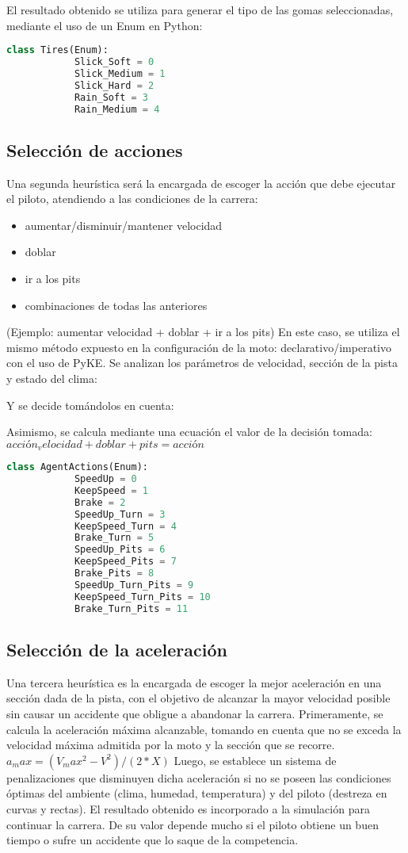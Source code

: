 	El resultado obtenido se utiliza para generar el tipo de las gomas seleccionadas, mediante el uso de un Enum en Python:
	\begin{lstlisting}[language={Python}, label={Script}]
		class Tires(Enum):
		    Slick_Soft = 0
		    Slick_Medium = 1
		    Slick_Hard = 2
		    Rain_Soft = 3
		    Rain_Medium = 4
	\end{lstlisting}


\subsection{Selección de acciones}
	Una segunda heurística será la encargada de escoger la acción que debe ejecutar el piloto, atendiendo a las condiciones de la carrera:
	\begin{itemize}
		\item aumentar/disminuir/mantener velocidad
		\item doblar
		\item ir a los pits
		\item combinaciones de todas las anteriores
	\end{itemize}
  	(Ejemplo: aumentar velocidad + doblar + ir a los pits)
	En este caso, se utiliza el mismo método expuesto en la configuración de la moto: declarativo/imperativo con el uso de PyKE.
	Se analizan los parámetros de velocidad, sección de la pista y estado del clima:


	Y se decide tomándolos en cuenta:


	Asimismo, se calcula mediante una ecuación el valor de la decisión tomada:
	$acción_velocidad + doblar + pits = acción$

	\begin{lstlisting}[language={Python}, label={Script}]
		class AgentActions(Enum):
			SpeedUp = 0
			KeepSpeed = 1
			Brake = 2
			SpeedUp_Turn = 3
			KeepSpeed_Turn = 4
			Brake_Turn = 5
			SpeedUp_Pits = 6
			KeepSpeed_Pits = 7
			Brake_Pits = 8
			SpeedUp_Turn_Pits = 9
			KeepSpeed_Turn_Pits = 10
			Brake_Turn_Pits = 11
	\end{lstlisting}

\subsection{Selección de la aceleración}
	Una tercera heurística es la encargada de escoger la mejor aceleración en una sección dada de la pista, con el objetivo de alcanzar la mayor velocidad posible sin causar un accidente que obligue a abandonar la carrera. 
	Primeramente, se calcula la aceleración máxima alcanzable, tomando en cuenta que no se exceda la velocidad máxima admitida por la moto y la sección que se recorre.
	$a_max=(V_max^{2}-V^{2})/(2*X)$
	Luego, se establece un sistema de penalizaciones que disminuyen dicha aceleración si no se poseen las condiciones óptimas del ambiente (clima, humedad, temperatura) y del piloto (destreza en curvas y rectas).
	El resultado obtenido es incorporado a la simulación para continuar la carrera. De su valor depende mucho si el piloto obtiene un buen tiempo o sufre un accidente que lo saque de la competencia.
